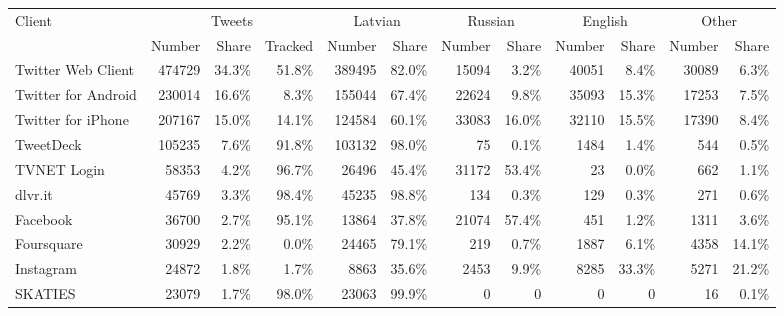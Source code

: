 \begin{tabular}{lrrrrrrrrrrr} 
\toprule
\multirow{2}{*}{Client} & \multicolumn{3}{c}{Tweets} & \multicolumn{2}{c}{Latvian} & \multicolumn{2}{c}{Russian} & \multicolumn{2}{c}{English} & \multicolumn{2}{c}{Other} \\
\cmidrule(r){2-4} \cmidrule(r){5-6} \cmidrule(r){7-8} \cmidrule(r){9-10} \cmidrule(r){11-12}
{} &  Number & Share & Tracked & Number & Share & Number & Share & Number & Share & Number & Share \\
\midrule
Twitter Web Client  &      474729 &       34.3\% &                51.8\% &            389495 &             82.0\% &             15094 &              3.2\% &             40051 &              8.4\% &            30089 &             6.3\% \\
Twitter for Android &      230014 &       16.6\% &                 8.3\% &            155044 &             67.4\% &             22624 &              9.8\% &             35093 &             15.3\% &            17253 &             7.5\% \\
Twitter for iPhone  &      207167 &       15.0\% &                14.1\% &            124584 &             60.1\% &             33083 &             16.0\% &             32110 &             15.5\% &            17390 &             8.4\% \\
TweetDeck           &      105235 &        7.6\% &                91.8\% &            103132 &             98.0\% &                75 &              0.1\% &              1484 &              1.4\% &              544 &             0.5\% \\
TVNET Login         &       58353 &        4.2\% &                96.7\% &             26496 &             45.4\% &             31172 &             53.4\% &                23 &              0.0\% &              662 &             1.1\% \\
dlvr.it             &       45769 &        3.3\% &                98.4\% &             45235 &             98.8\% &               134 &              0.3\% &               129 &              0.3\% &              271 &             0.6\% \\
Facebook            &       36700 &        2.7\% &                95.1\% &             13864 &             37.8\% &             21074 &             57.4\% &               451 &              1.2\% &             1311 &             3.6\% \\
Foursquare          &       30929 &        2.2\% &                 0.0\% &             24465 &             79.1\% &               219 &              0.7\% &              1887 &              6.1\% &             4358 &            14.1\% \\
Instagram           &       24872 &        1.8\% &                 1.7\% &              8863 &             35.6\% &              2453 &              9.9\% &              8285 &             33.3\% &             5271 &            21.2\% \\
SKATIES             &       23079 &        1.7\% &                98.0\% &             23063 &             99.9\% &                 0 &                 0 &                 0 &                 0 &               16 &             0.1\% \\
\bottomrule
\end{tabular}
